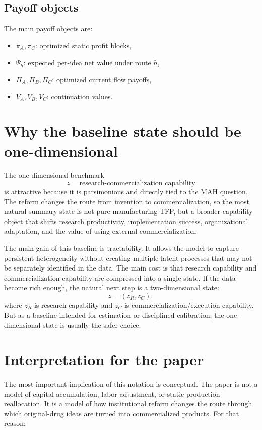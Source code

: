 \documentclass[12pt]{article}
\begin{document}
\subsection{Payoff objects}

The main payoff objects are:
\begin{itemize}[leftmargin=2em]
    \item $\bar{\pi}_A,\bar{\pi}_C$: optimized static profit blocks,
    \item $\Psi_h$: expected per-idea net value under route $h$,
    \item $\Pi_A,\Pi_B,\Pi_C$: optimized current flow payoffs,
    \item $V_A,V_B,V_C$: continuation values.
\end{itemize}

\section{Why the baseline state should be one-dimensional}

The one-dimensional benchmark
\[
z=\text{research-commercialization capability}
\]
is attractive because it is parsimonious and directly tied to the MAH question.
The reform changes the route from invention to commercialization, so the most natural
summary state is not pure manufacturing TFP, but a broader capability object that
shifts research productivity, implementation success, organizational adaptation, and
the value of using external commercialization.

The main gain of this baseline is tractability. It allows the model to capture persistent
heterogeneity without creating multiple latent processes that may not be separately
identified in the data. The main cost is that research capability and commercialization
capability are compressed into a single state. If the data become rich enough, the natural
next step is a two-dimensional state:
\[
z=(z_R,z_C),
\]
where $z_R$ is research capability and $z_C$ is commercialization/execution capability.
But as a baseline intended for estimation or disciplined calibration, the one-dimensional
state is usually the safer choice.

\section{Interpretation for the paper}

The most important implication of this notation is conceptual. The paper is not a model
of capital accumulation, labor adjustment, or static production reallocation. It is a model
of how institutional reform changes the route through which original-drug ideas are turned
into commercialized products. For that reason:
\end{document}
